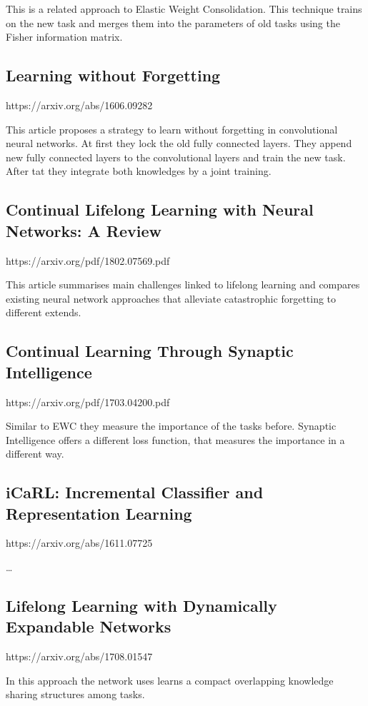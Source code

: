 This is a related approach to Elastic Weight Consolidation.
This technique trains on the new task and merges them into the parameters of old tasks using the Fisher information matrix.

\subsection*{Learning without Forgetting}
https://arxiv.org/abs/1606.09282

This article proposes a strategy to learn without forgetting in convolutional neural networks.
At first they lock the old fully connected layers. They append new fully connected layers to the convolutional layers and train the new task.
After tat they integrate both knowledges by a joint training.

\subsection*{Continual Lifelong Learning with Neural Networks: A Review}
https://arxiv.org/pdf/1802.07569.pdf

This article summarises main challenges linked to lifelong learning and compares existing neural network approaches that alleviate catastrophic forgetting to different extends.

\subsection*{Continual Learning Through Synaptic Intelligence}
https://arxiv.org/pdf/1703.04200.pdf

Similar to EWC they measure the importance of the tasks before.
Synaptic Intelligence offers a different loss function, that measures the importance in a different way.

\subsection*{iCaRL: Incremental Classifier and Representation Learning}
https://arxiv.org/abs/1611.07725

…

\subsection*{Lifelong Learning with Dynamically Expandable Networks}
https://arxiv.org/abs/1708.01547

In this approach the network uses learns a compact overlapping knowledge sharing structures among tasks.

